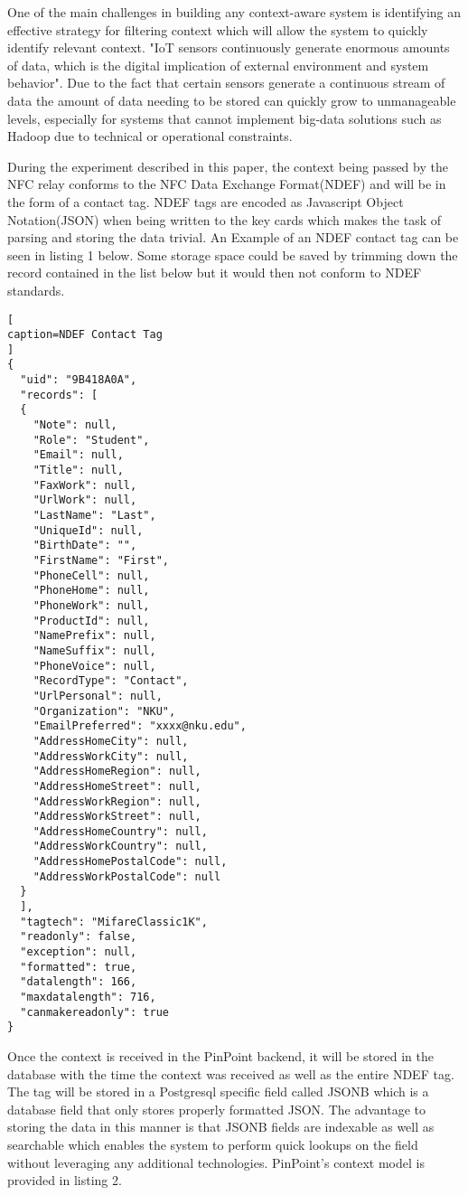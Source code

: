 \documentclass[11pt,journal]{IEEEtran}
\begin{document}
One of the main challenges in building any context-aware system is identifying an effective strategy for filtering context which will allow the system to quickly identify relevant context.  "IoT sensors continuously generate enormous amounts of data, which is the digital implication of external environment and system behavior".\cite{Song:2018:TIC:3180374.3181341}  Due to the fact that certain sensors generate a continuous stream of data the amount of data needing to be stored can quickly grow to unmanageable levels, especially for systems that cannot implement big-data solutions such as Hadoop due to technical or operational constraints.

During the experiment described in this paper, the context being passed by the NFC relay conforms to the NFC Data Exchange Format(NDEF) and will be in the form of a contact tag. NDEF tags are encoded as Javascript Object Notation(JSON) when being written to the key cards which makes the task of parsing and storing the data trivial. An Example of an NDEF contact tag can be seen in listing 1 below.  Some storage space could be saved by trimming down the record contained in the list below but it would then not conform to NDEF standards.

\begin{lstlisting}[
caption=NDEF Contact Tag
]
{
  "uid": "9B418A0A",
  "records": [
  {
    "Note": null,
	"Role": "Student",
	"Email": null,
	"Title": null,
	"FaxWork": null,
	"UrlWork": null,
	"LastName": "Last",
	"UniqueId": null,
	"BirthDate": "",
	"FirstName": "First",
	"PhoneCell": null,
	"PhoneHome": null,
	"PhoneWork": null,
	"ProductId": null,
	"NamePrefix": null,
	"NameSuffix": null,
	"PhoneVoice": null,
	"RecordType": "Contact",
	"UrlPersonal": null,
	"Organization": "NKU",
	"EmailPreferred": "xxxx@nku.edu",
	"AddressHomeCity": null,
	"AddressWorkCity": null,
	"AddressHomeRegion": null,
	"AddressHomeStreet": null,
	"AddressWorkRegion": null,
	"AddressWorkStreet": null,
	"AddressHomeCountry": null,
	"AddressWorkCountry": null,
	"AddressHomePostalCode": null,
	"AddressWorkPostalCode": null
  }
  ],
  "tagtech": "MifareClassic1K",
  "readonly": false,
  "exception": null,
  "formatted": true,
  "datalength": 166,
  "maxdatalength": 716,
  "canmakereadonly": true
}
\end{lstlisting}

Once the context is received in the PinPoint backend, it will be stored in the database with the time the context was received as well as the entire NDEF tag.  The tag will be stored in a Postgresql specific field called JSONB which is a database field that only stores properly formatted JSON.  The advantage to storing the data in this manner is that JSONB fields are indexable as well as searchable which enables the system to perform quick lookups on the field without leveraging any additional technologies. PinPoint's context model is provided in listing 2.
\end{document}
